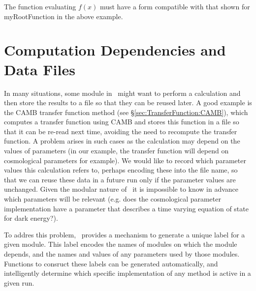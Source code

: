 The function evaluating $f(x)$ must have a form compatible with that shown for {\normalfont \ttfamily myRootFunction} in the above example.

\section{Computation Dependencies and Data Files}\label{sec:codeUniqueLabels}

In many situations, some module in \glc\ might want to perform a calculation and then store the results to a file so that they can be reused later. A good example is the {\normalfont \ttfamily CAMB} transfer function method (see \S\ref{sec:TransferFunction:CAMB}), which computes a transfer function using {\normalfont \scshape CAMB} and stores this function in a file so that it can be re-read next time, avoiding the need to recompute the transfer function. A problem arises in such cases as the calculation may depend on the values of parameters (in our example, the transfer function will depend on cosmological parameters for example). We would like to record which parameter values this calculation refers to, perhaps encoding these into the file name, so that we can reuse these data in a future run only if the parameter values are unchanged. Given the modular nature of \glc\ it is impossible to know in advance which parameters will be relevant (e.g. does the cosmological parameter implementation have a parameter that describes a time varying equation of state for dark energy?). 

To addres this problem, \glc\ provides a mechanism to generate a unique label for a given module. This label encodes the names of modules on which the module depends, and the names and values of any parameters used by those modules. Functions to consruct these labels can be generated automatically, and intelligently determine which specific implementation of any method is active in a given run.

